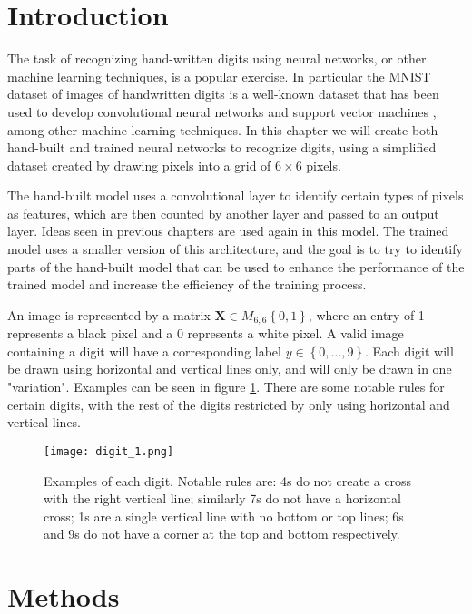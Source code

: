 \documentclass{somasmsc}
\begin{document}
\section{Introduction}

The task of recognizing hand-written digits using neural networks, or other machine learning techniques, is a popular exercise. In particular the MNIST dataset of images of handwritten digits is a well-known dataset that has been used to develop convolutional neural networks \citep{ciresan2011convolutional} and support vector machines \citep{platt1998using}, among other machine learning techniques. In this chapter we will create both hand-built and trained neural networks to recognize digits, using a simplified dataset created by drawing pixels into a grid of $6 \times 6$ pixels.

The hand-built model uses a convolutional layer to identify certain types of pixels as features, which are then counted by another layer and passed to an output layer. Ideas seen in previous chapters are used again in this model. The trained model uses a smaller version of this architecture, and the goal is to try to identify parts of the hand-built model that can be used to enhance the performance of the trained model and increase the efficiency of the training process.

An image is represented by a matrix $\mathbf{X} \in M_{6,6}\left\{0,1\right\}$, where an entry of 1 represents a black pixel and a 0 represents a white pixel. A valid image containing a digit will have a corresponding label $y \in \left\{0, \dots, 9\right\}$. Each digit will be drawn using horizontal and vertical lines only, and will only be drawn in one "variation". Examples can be seen in figure \ref{digit:fig1}. There are some notable rules for certain digits, with the rest of the digits restricted by only using horizontal and vertical lines.

\begin{figure}[H]\label{digit:fig1}
\begin{center}
\texttt{[image: digit\_1.png]}
\end{center}
\caption{Examples of each digit. Notable rules are: 4s do not create a cross with the right vertical line; similarly 7s do not have a horizontal cross; 1s are a single vertical line with no bottom or top lines; 6s and 9s do not have a corner at the top and bottom respectively.}
\end{figure}

\section{Methods}
\end{document}
